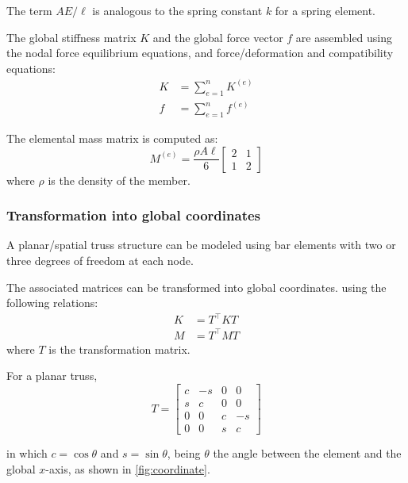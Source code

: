The term $AE/\ell$ is analogous to the spring constant $k$ for a spring element.

The global stiffness matrix $K$ and the global force vector $f$ are assembled using the nodal force equilibrium equations, and force/deformation and compatibility equations:
%
\begin{align}
    K &= \sum_{e=1}^n K^{(e)}\\
    f &= \sum_{e=1}^n f^{(e)}
\end{align}
%

The elemental mass matrix is computed as:
%
\begin{equation}
    M^{(e)} = \dfrac{\rho A \ell}{6} \begin{bmatrix} 2 & 1 \\ 1 & 2\end{bmatrix}
\end{equation}
%
where $\rho$ is the density of the member.

\subsubsection{Transformation into global coordinates}

A planar/spatial truss structure can be modeled using bar elements with two or three degrees of freedom at each node.

The associated matrices can be transformed into global coordinates. using the following relations:
%
\begin{align}
    K &= T^\intercal K T\\
    M &= T^\intercal M T
\end{align}
%
where $T$ is the transformation matrix.

For a planar truss,
%
\begin{equation}
    T = \begin{bmatrix} c & -s & 0 & 0 \\ s & c & 0 & 0 \\ 0 & 0 & c & -s \\ 0 & 0 & s & c \end{bmatrix}
\end{equation}

in which $c = \cos \theta$ and $s = \sin \theta$, being $\theta$ the angle between the element and the global $x$-axis, as shown in \autoref{fig:coordinate}.

